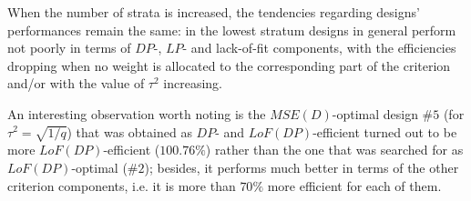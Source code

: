 When the number of strata is increased, the tendencies regarding designs' performances remain the same: in the lowest stratum designs in general perform not poorly in terms of $DP$-, $LP$- and lack-of-fit components, with the efficiencies dropping when no weight is allocated to the corresponding part of the criterion and/or with the value of $\tau^2$ increasing. 

An interesting observation worth noting is the $MSE(D)$-optimal design \#$5$ (for $\tau^2=\sqrt{1/q}$) that was obtained as $DP$- and $LoF(DP)$-efficient turned out to be more $LoF(DP)$-efficient ($100.76\%$) rather than the one that was searched for as $LoF(DP)$-optimal (\#$2$); besides, it performs much better in terms of the other criterion components, i.e. it is more than $70\%$ more efficient for each of them. 

  
